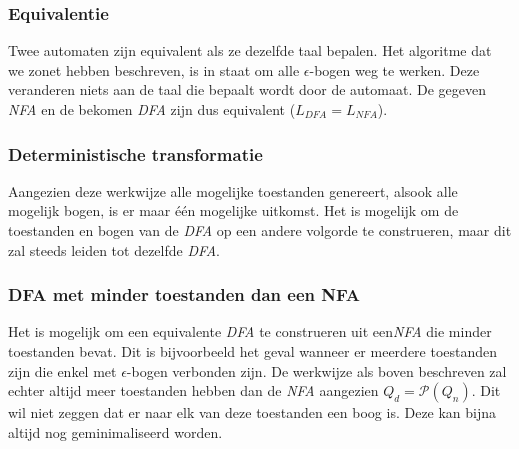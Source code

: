 \subsubsection*{Equivalentie}
Twee automaten zijn equivalent als ze dezelfde taal bepalen. Het algoritme dat we zonet hebben beschreven, is in staat om alle $\epsilon$-bogen weg te werken. Deze veranderen niets aan de taal die bepaalt wordt door de automaat. De gegeven \emph{NFA} en de bekomen \emph{DFA} zijn dus equivalent ($L_{DFA} = L_{NFA}$).

\subsubsection*{Deterministische transformatie}
Aangezien deze werkwijze alle mogelijke toestanden genereert, alsook alle mogelijk bogen, is er maar \'e\'en mogelijke uitkomst. Het is mogelijk om de toestanden en bogen van de \emph{DFA} op een andere volgorde te construeren, maar dit zal steeds leiden tot dezelfde \emph{DFA}.

\subsubsection*{DFA met minder toestanden dan een NFA}

Het is mogelijk om een equivalente \emph{DFA} te construeren uit een\emph{NFA} die minder toestanden bevat. Dit is bijvoorbeeld het geval wanneer er meerdere toestanden zijn die enkel met $\epsilon$-bogen verbonden zijn. De werkwijze als boven beschreven zal echter altijd meer toestanden hebben dan de \emph{NFA} aangezien $Q_d = \mathcal{P}(Q_n)$. Dit wil niet zeggen dat er naar elk van deze toestanden een boog is. Deze kan bijna altijd nog geminimaliseerd worden.
